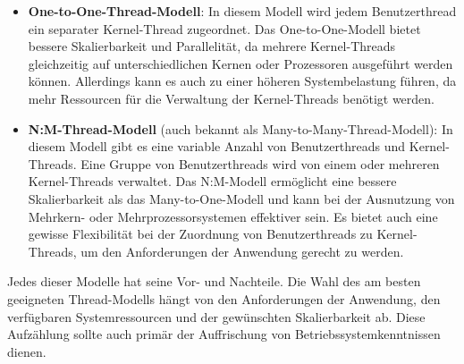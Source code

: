 \begin{itemize}
\item \textbf{One-to-One-Thread-Modell}: In diesem Modell wird jedem Benutzerthread ein separater Kernel-Thread zugeordnet. Das One-to-One-Modell bietet bessere Skalierbarkeit und Parallelität, da mehrere Kernel-Threads gleichzeitig auf unterschiedlichen Kernen oder Prozessoren ausgeführt werden können. Allerdings kann es auch zu einer höheren Systembelastung führen, da mehr Ressourcen für die Verwaltung der Kernel-Threads benötigt werden.
\item \textbf{N:M-Thread-Modell} (auch bekannt als Many-to-Many-Thread-Modell): In diesem Modell gibt es eine variable Anzahl von Benutzerthreads und Kernel-Threads. Eine Gruppe von Benutzerthreads wird von einem oder mehreren Kernel-Threads verwaltet. Das N:M-Modell ermöglicht eine bessere Skalierbarkeit als das Many-to-One-Modell und kann bei der Ausnutzung von Mehrkern- oder Mehrprozessorsystemen effektiver sein. Es bietet auch eine gewisse Flexibilität bei der Zuordnung von Benutzerthreads zu Kernel-Threads, um den Anforderungen der Anwendung gerecht zu werden.
\end{itemize}
Jedes dieser Modelle hat seine Vor- und Nachteile. Die Wahl des am besten geeigneten Thread-Modells hängt von den Anforderungen der Anwendung, den verfügbaren Systemressourcen und der gewünschten Skalierbarkeit ab. Diese Aufzählung sollte auch primär der Auffrischung von Betriebssystemkenntnissen dienen. \\\\

